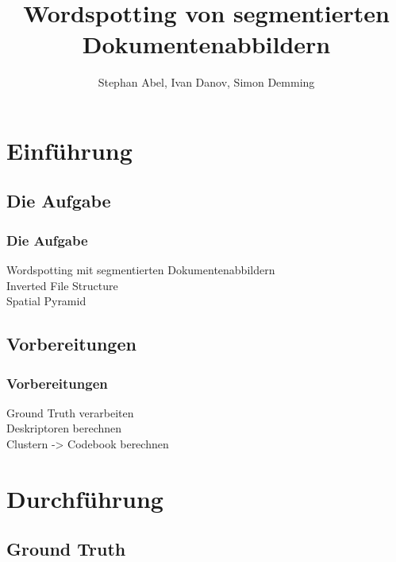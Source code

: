 \documentclass[9pt]{beamer}
\title{Wordspotting von segmentierten Dokumentenabbildern}
\author{Stephan Abel, Ivan Danov, Simon Demming}
\institute[]{\par\smallskip\smallskip Faculty for Computer Science}
\begin{document}
	\begin{frame}
		\setcounter{framenumber}{0}
	    \titlepage
	\end{frame}
	
	\section{Einführung}
	
		\subsection{Die Aufgabe}
			
			\begin{frame}
				\frametitle{Die Aufgabe}
				Wordspotting mit segmentierten Dokumentenabbildern\\
				Inverted File Structure\\
				Spatial Pyramid\\
			\end{frame}
			
		\subsection{Vorbereitungen}
		
			\begin{frame}
				\frametitle{Vorbereitungen}
				Ground Truth verarbeiten\\
				Deskriptoren berechnen\\
				Clustern -> Codebook berechnen\\
			\end{frame}
			
	\section{Durchführung}
	
		\subsection{Ground Truth}
			
\end{document}
